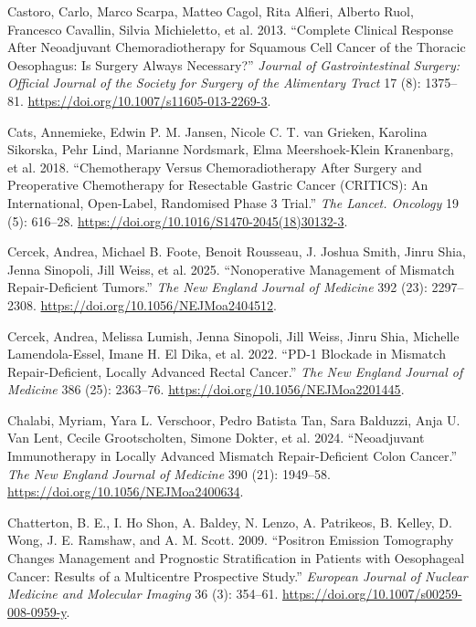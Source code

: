 \documentclass[
  letterpaper,
]{scrbook}
\newlength{\cslhangindent}
\newenvironment{CSLReferences}[2] %
 {\begin{list}{}{%
  \setlength{\itemindent}{0pt}
  \setlength{\leftmargin}{0pt}
  \setlength{\parsep}{0pt}
  \ifodd #1
   \setlength{\leftmargin}{\cslhangindent}
   \setlength{\itemindent}{-1\cslhangindent}
  \fi
  \setlength{\itemsep}{#2\baselineskip}}}
 {\end{list}}
\begin{document}
\begin{CSLReferences}{1}{0}
Castoro, Carlo, Marco Scarpa, Matteo Cagol, Rita Alfieri, Alberto Ruol,
Francesco Cavallin, Silvia Michieletto, et al. 2013. {``Complete
Clinical Response After Neoadjuvant Chemoradiotherapy for Squamous Cell
Cancer of the Thoracic Oesophagus: Is Surgery Always Necessary?''}
\emph{Journal of Gastrointestinal Surgery: Official Journal of the
Society for Surgery of the Alimentary Tract} 17 (8): 1375--81.
\url{https://doi.org/10.1007/s11605-013-2269-3}.

Cats, Annemieke, Edwin P. M. Jansen, Nicole C. T. van Grieken, Karolina
Sikorska, Pehr Lind, Marianne Nordsmark, Elma Meershoek-Klein
Kranenbarg, et al. 2018. {``Chemotherapy Versus Chemoradiotherapy After
Surgery and Preoperative Chemotherapy for Resectable Gastric Cancer
({CRITICS}): An International, Open-Label, Randomised Phase 3 Trial.''}
\emph{The Lancet. Oncology} 19 (5): 616--28.
\url{https://doi.org/10.1016/S1470-2045(18)30132-3}.

Cercek, Andrea, Michael B. Foote, Benoit Rousseau, J. Joshua Smith,
Jinru Shia, Jenna Sinopoli, Jill Weiss, et al. 2025. {``Nonoperative
{Management} of {Mismatch} {Repair}-{Deficient} {Tumors}.''} \emph{The
New England Journal of Medicine} 392 (23): 2297--2308.
\url{https://doi.org/10.1056/NEJMoa2404512}.

Cercek, Andrea, Melissa Lumish, Jenna Sinopoli, Jill Weiss, Jinru Shia,
Michelle Lamendola-Essel, Imane H. El Dika, et al. 2022. {``{PD}-1
{Blockade} in {Mismatch} {Repair}-{Deficient}, {Locally} {Advanced}
{Rectal} {Cancer}.''} \emph{The New England Journal of Medicine} 386
(25): 2363--76. \url{https://doi.org/10.1056/NEJMoa2201445}.

Chalabi, Myriam, Yara L. Verschoor, Pedro Batista Tan, Sara Balduzzi,
Anja U. Van Lent, Cecile Grootscholten, Simone Dokter, et al. 2024.
{``Neoadjuvant {Immunotherapy} in {Locally} {Advanced} {Mismatch}
{Repair}-{Deficient} {Colon} {Cancer}.''} \emph{The New England Journal
of Medicine} 390 (21): 1949--58.
\url{https://doi.org/10.1056/NEJMoa2400634}.

Chatterton, B. E., I. Ho Shon, A. Baldey, N. Lenzo, A. Patrikeos, B.
Kelley, D. Wong, J. E. Ramshaw, and A. M. Scott. 2009. {``Positron
Emission Tomography Changes Management and Prognostic Stratification in
Patients with Oesophageal Cancer: Results of a Multicentre Prospective
Study.''} \emph{European Journal of Nuclear Medicine and Molecular
Imaging} 36 (3): 354--61.
\url{https://doi.org/10.1007/s00259-008-0959-y}.


\end{CSLReferences}
\end{document}
